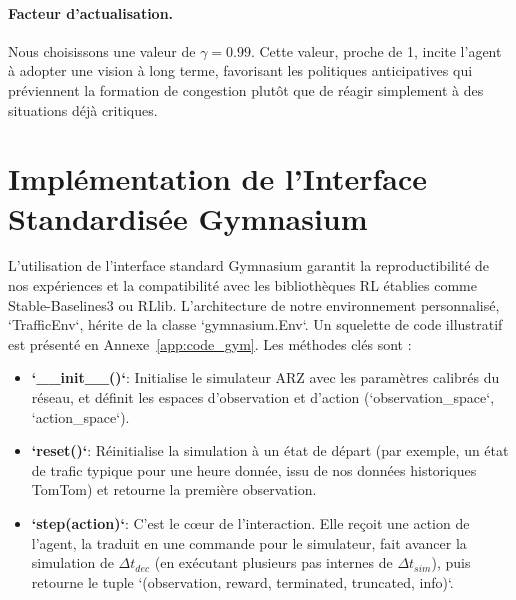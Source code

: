\paragraph{Facteur d'actualisation.} Nous choisissons une valeur de $\gamma = 0.99$. Cette valeur, proche de 1, incite l'agent à adopter une vision à long terme, favorisant les politiques anticipatives qui préviennent la formation de congestion plutôt que de réagir simplement à des situations déjà critiques.

\section{Implémentation de l'Interface Standardisée Gymnasium}
\label{sec:implementation_gym}

L'utilisation de l'interface standard Gymnasium \parencite{Gymnasium:2023} garantit la reproductibilité de nos expériences et la compatibilité avec les bibliothèques RL établies comme Stable-Baselines3 ou RLlib. L'architecture de notre environnement personnalisé, `TrafficEnv`, hérite de la classe `gymnasium.Env`. Un squelette de code illustratif est présenté en Annexe~\ref{app:code_gym}. Les méthodes clés sont :

\begin{itemize}
    \item \textbf{`\_\_init\_\_()`}: Initialise le simulateur ARZ avec les paramètres calibrés du réseau, et définit les espaces d'observation et d'action (`observation\_space`, `action\_space`).
    \item \textbf{`reset()`}: Réinitialise la simulation à un état de départ (par exemple, un état de trafic typique pour une heure donnée, issu de nos données historiques TomTom) et retourne la première observation.
    \item \textbf{`step(action)`}: C'est le cœur de l'interaction. Elle reçoit une action de l'agent, la traduit en une commande pour le simulateur, fait avancer la simulation de $\Delta t_{dec}$ (en exécutant plusieurs pas internes de $\Delta t_{sim}$), puis retourne le tuple `(observation, reward, terminated, truncated, info)`.
\end{itemize}


